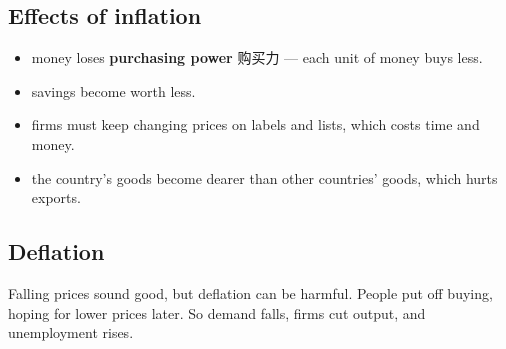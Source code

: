 \documentclass[11pt]{article}
\begin{document}
\subsection*{Effects of inflation}

\begin{itemize}
\item money loses \textbf{purchasing power} 购买力 — each unit of money buys less.

\item savings become worth less.

\item firms must keep changing prices on labels and lists, which costs time and money.

\item the country's goods become dearer than other countries' goods, which hurts exports.

\end{itemize}

\subsection*{Deflation}

Falling prices sound good, but deflation can be harmful. People put off buying, hoping for lower prices later. So demand falls, firms cut output, and unemployment rises.
\end{document}

